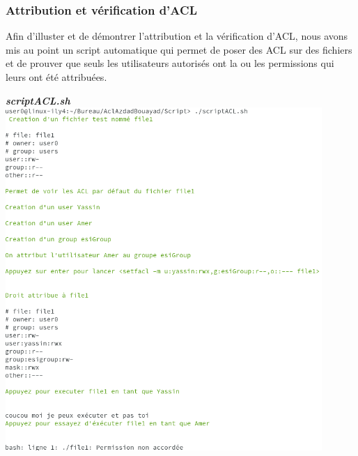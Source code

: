\documentclass{article}
\begin{document}
\subsubsection{Attribution et vérification d'ACL}
Afin d'illuster et de démontrer l'attribution et la vérification d'ACL, nous avons mis au point un script automatique qui permet de poser des ACL sur des fichiers et de prouver que seuls les utilisateurs autorisés ont la ou les permissions qui leurs ont été attribuées. \newline
\begin{center}
    \textbf{\textit{scriptACL.sh}}
\includegraphics[width=12cm]{images/scriptACL.png}
\end{center}

\newpage
\end{document}
